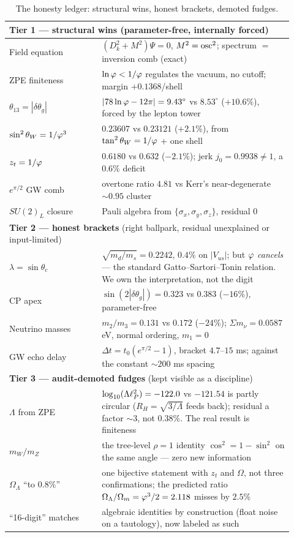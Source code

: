 \begin{table}[h]
\centering
\small
\begin{tabular}{p{0.30\linewidth}p{0.62\linewidth}}
\toprule
\multicolumn{2}{l}{\textbf{Tier 1 --- structural wins} (parameter-free, internally forced)} \\
\midrule
Field equation & $(D_k^2+M^2)\Psi=0$, $M^2=\operatorname{osc}^2$; spectrum $=$ inversion comb (exact) \\
ZPE finiteness & $\ln\varphi<1/\varphi$ regulates the vacuum, no cutoff; margin $+0.1368$/shell \\
$\theta_{13}=|\delta\theta_g|$ & $|78\ln\varphi-12\pi|=9.43^\circ$ vs $8.53^\circ$ ($+10.6\%$), forced by the lepton tower \\
$\sin^2\theta_W=1/\varphi^3$ & $0.23607$ vs $0.23121$ ($+2.1\%$), from $\tan^2\theta_W=1/\varphi$ + one shell \\
$z_t=1/\varphi$ & $0.6180$ vs $0.632$ ($-2.1\%$); jerk $j_0=0.9938\neq1$, a $0.6\%$ deficit \\
$e^{\pi/2}$ GW comb & overtone ratio $4.81$ vs Kerr's near-degenerate $\sim0.95$ cluster \\
$SU(2)_L$ closure & Pauli algebra from $\{\sigma_x,\sigma_y,\sigma_z\}$, residual $0$ \\
\midrule
\multicolumn{2}{l}{\textbf{Tier 2 --- honest brackets} (right ballpark, residual unexplained or input-limited)} \\
\midrule
$\lambda=\sin\theta_c$ & $\sqrt{m_d/m_s}=0.2242$, $0.4\%$ on $|V_{us}|$; but $\varphi$ \emph{cancels} --- the standard Gatto--Sartori--Tonin relation. We own the interpretation, not the digit \\
CP apex & $\sin(2|\delta\theta_g|)=0.323$ vs $0.383$ ($-16\%$), parameter-free \\
Neutrino masses & $m_2/m_3=0.131$ vs $0.172$ ($-24\%$); $\Sigma m_\nu=0.0587$ eV, normal ordering, $m_1=0$ \\
GW echo delay & $\Delta t=t_0(e^{\pi/2}-1)$, bracket $4.7$--$15$ ms; against the constant $\sim200$ ms spacing \\
\midrule
\multicolumn{2}{l}{\textbf{Tier 3 --- audit-demoted fudges} (kept visible as a discipline)} \\
\midrule
$\Lambda$ from ZPE & $\log_{10}(\Lambda\ell_{P}^2)=-122.0$ vs $-121.54$ is partly circular ($R_H=\sqrt{3/\Lambda}$ feeds back); residual a factor $\sim3$, not $0.38\%$. The real result is finiteness \\
$m_W/m_Z$ & the tree-level $\rho=1$ identity $\cos^2=1-\sin^2$ on the same angle --- zero new information \\
$\Omega_\Lambda$ ``to $0.8\%$'' & one bijective statement with $z_t$ and $\Omega$, not three confirmations; the predicted ratio $\Omega_\Lambda/\Omega_m=\varphi^3/2=2.118$ misses by $2.5\%$ \\
``16-digit'' matches & algebraic identities by construction (float noise on a tautology), now labeled as such \\
\bottomrule
\end{tabular}
\caption{The honesty ledger: structural wins, honest brackets, demoted fudges.}
\label{tab:scale:ledger}
\end{table}

